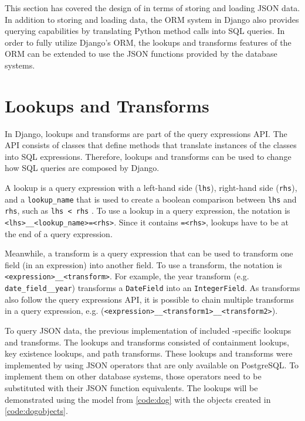 This section has covered the design of  in terms of storing and
loading JSON data. In addition to storing and loading data, the ORM system in
Django also provides querying capabilities by translating Python method calls
into SQL  queries. In order to fully utilize Django's ORM, the
lookups and transforms features of the ORM can be extended to use the JSON
functions provided by the database systems.

\section{ Lookups and Transforms}

In Django, lookups and transforms are part of the query expressions API. The
API consists of classes that define methods that translate instances of the
classes into SQL expressions. Therefore, lookups and transforms can be used to
change how SQL queries are composed by Django.

A lookup is a query expression with a left-hand side (\verb|lhs|), right-hand
side (\verb|rhs|), and a \verb|lookup_name| that is used to create a boolean
comparison between \verb|lhs| and \verb|rhs|, such as \verb|lhs < rhs|
\cite{django:lookups}. To use a lookup in a query expression, the notation is
\verb|<lhs>__<lookup_name>=<rhs>|. Since it contains \verb|=<rhs>|, lookups
have to be at the end of a query expression.

Meanwhile, a transform is a query expression that can be used to transform one
field (in an expression) into another field. To use a transform, the notation
is \verb|<expression>__<transform>|. For example, the year transform (e.g.
\verb|date_field__year|) transforms a \verb|DateField| into an
\verb|IntegerField|. As transforms also follow the query expressions API, it is
possible to chain multiple transforms in a query expression, e.g.
(\verb|<expression>__<transform1>__<transform2>|).

To query JSON data, the previous implementation of  included
-specific lookups and transforms. The lookups and transforms
consisted of containment lookups, key existence lookups, and path transforms.
These lookups and transforms were implemented by using JSON operators that are
only available on PostgreSQL. To implement them on other database systems,
those operators need to be substituted with their JSON function equivalents.
The lookups will be demonstrated using the  model from
\autoref{code:dog} with the objects created in \autoref{code:dogobjects}.

